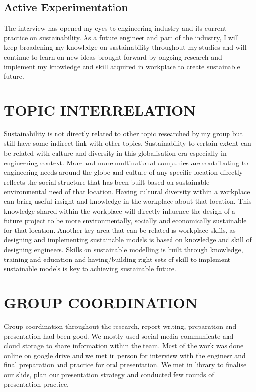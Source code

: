 \documentclass{article}
\begin{document}
\subsection{Active Experimentation}\label{Now what}
The interview has opened my eyes to engineering industry and its current practice on sustainability. As a future engineer and part of the industry, I will keep broadening my knowledge on sustainability throughout my studies and will continue to learn on new ideas brought forward by ongoing research and implement my knowledge and skill acquired in workplace to create sustainable future.
\section{TOPIC INTERRELATION}\label{Topic}
Sustainability is not directly related to other topic researched by my group but still have some indirect link with other topics. Sustainability to certain extent can be related with culture and diversity in this globalisation era especially in engineering context. More and more multinational companies are contributing to engineering needs around the globe and culture of any specific location directly reflects the social structure that has been built based on sustainable environmental need of that location. Having cultural diversity within a workplace can bring useful insight and knowledge in the workplace about that location. This knowledge shared within the workplace will directly influence the design of a future project to be more environmentally, socially and economically sustainable for that location. Another key area that can be related is workplace skills, as designing and implementing sustainable models is based on knowledge and skill of designing engineers. Skills on sustainable modelling is built through knowledge, training and education and having/building right sets of skill to implement sustainable models is key to achieving sustainable future.
\section{GROUP COORDINATION}\label{Group}
Group coordination throughout the research, report writing, preparation and presentation had been good. We mostly used social media communicate and cloud storage to share information within the team. Most of the work was done online on google drive and we met in person for interview with the engineer and final preparation and practice for oral presentation. We met in library to finalise our slide, plan our presentation strategy and conducted few rounds of presentation practice.        
\end{document}
